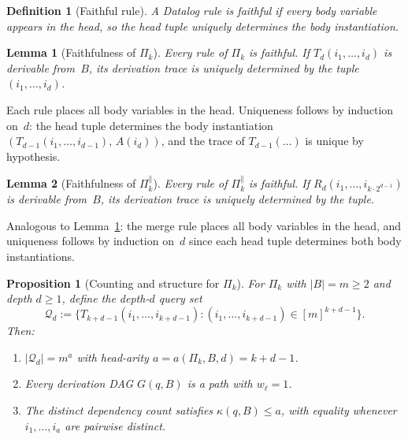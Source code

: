 \documentclass[journal]{IEEEtran}
\makeatletter
\newtheorem{lemma}{Lemma}[section]
\newtheorem{proposition}{Proposition}[section]
\newtheorem{definition}{Definition}[section]
\numberwithin{equation}{section}
\renewenvironment{proof}[1][\proofname]{\par
  \pushQED{\qed}%
  \normalfont \topsep6\p@\@plus6\p@\relax
  \trivlist
  \item[\hskip\labelsep
        \itshape
    #1\@addpunct{.}]\ignorespaces
}{%
  \popQED\endtrivlist\@endpefalse
}
\makeatother
\begin{document}
\begin{definition}[Faithful rule]
\label{def:faithful-rule}
A Datalog rule is \emph{faithful} if every body variable
appears in the head, so the head tuple uniquely determines
the body instantiation.
\end{definition}

\begin{lemma}[Faithfulness of $\Pi_k$]
\label{lem:faithfulness}
Every rule of\/ $\Pi_k$ is faithful.
If $T_d(i_1,\ldots,i_d)$ is derivable from~$B$, its
derivation trace is uniquely determined by the tuple
$(i_1,\ldots,i_d)$.
\end{lemma}

\begin{proof}
Each rule places all body variables in the head.
Uniqueness follows by induction on~$d$: the head tuple
determines the body instantiation
$(T_{d-1}(i_1,\ldots,i_{d-1}),\,A(i_d))$, and the trace
of $T_{d-1}(\ldots)$ is unique by hypothesis.
\end{proof}

\begin{lemma}[Faithfulness of $\Pi_k^{\parallel}$]
\label{lem:merge-faithfulness}
Every rule of $\Pi_k^{\parallel}$ is faithful.
If $R_d(i_1,\ldots,i_{k\cdot 2^{d-1}})$ is derivable
from~$B$, its derivation trace is uniquely determined by
the tuple.
\end{lemma}

\begin{proof}
Analogous to Lemma~\ref{lem:faithfulness}: the merge rule
places all body variables in the head, and uniqueness follows
by induction on~$d$ since each head tuple determines both
body instantiations.
\end{proof}

\begin{proposition}[Counting and structure for \(\Pi_k\)]
\label{prop:tuple-counting}
For \(\Pi_k\) with \(|B|=m\ge 2\) and depth \(d\ge 1\), define the depth-\(d\)
query set
\[
  \mathcal{Q}_d:=\{T_{k+d-1}(i_1,\ldots,i_{k+d-1}): (i_1,\ldots,i_{k+d-1})\in[m]^{k+d-1}\}.
\]
Then:
\begin{enumerate}[label=\textup{(\roman*)}]
\item \(|\mathcal{Q}_d|=m^{a}\) with head-arity \(a=a(\Pi_k,B,d)=k+d-1\).
\item Every derivation DAG \(G(q,B)\) is a path with \(w_\ell=1\).
\item The distinct dependency count satisfies \(\kappa(q,B)\le a\), with equality
whenever \(i_1,\ldots,i_a\) are pairwise distinct.
\end{enumerate}
\end{proposition}
\end{document}
